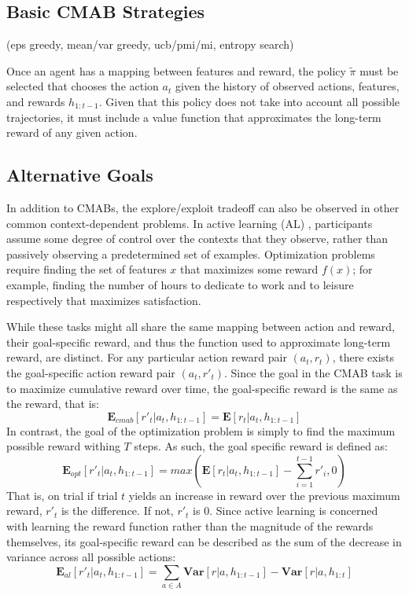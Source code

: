 \documentclass[10pt,letterpaper]{article}
\begin{document}
	
	
	\subsection{Basic CMAB Strategies}
	
	(eps greedy, mean/var greedy, ucb/pmi/mi, entropy search)
	
	Once an agent has a mapping between features and reward, the policy $\tilde{\pi}$ must be selected that chooses the action $a_{t}$ given the history of observed actions, features, and rewards $h_{1:t-1}$. Given that this policy does not take into account all possible trajectories, it must include a value function that approximates the long-term reward of any given action.
	
	\subsection{Alternative Goals}
	
	In addition to CMABs, the explore/exploit tradeoff can also be observed in other common context-dependent problems. In active learning (AL) \cite{BramleyGerstenbergTenenbaum2016a}, participants assume some degree of control over the contexts that they observe, rather than passively observing a predetermined set of examples. Optimization problems \cite{Rachlin1981a} require finding the set of features $x$ that maximizes some reward $f(x)$; for example, finding the number of hours to dedicate to work and to leisure respectively that maximizes satisfaction.
	
	While these tasks might all share the same mapping between action and reward, their goal-specific reward, and thus the function used to approximate long-term reward, are distinct. For any particular action reward pair $(a_{t}, r_{t})$, there exists the goal-specific action reward pair $(a_{t}, r'_{t})$. Since the goal in the CMAB task is to maximize cumulative reward over time, the goal-specific reward is the same as the reward, that is:
	$$\mathbf{E}_{cmab}[r'_{t}|a_{t}, h_{1:t-1}] = \mathbf{E}[r_{t}|a_{t}, h_{1:t-1}]$$
	In contrast, the goal of the optimization problem is simply to find the maximum possible reward withing $T$ steps. As such, the goal specific reward is defined as:
	$$\mathbf{E}_{opt}[r'_{t}|a_{t}, h_{1:t-1}] = max(\mathbf{E}[r_{t}|a_{t}, h_{1:t-1}] - \sum_{i=1}^{t-1}r'_{i}, 0)$$
	That is, on trial if trial $t$ yields an increase in reward over the previous maximum reward, $r'_{t}$ is the difference. If not, $r'_{t}$ is 0. Since active learning is concerned with learning the reward function rather than the magnitude of the rewards themselves, its goal-specific reward can be described as the sum of the decrease in variance across all possible actions:
	$$\mathbf{E}_{al}[r'_{t}|a_{t}, h_{1:t-1}] = \sum_{a \in A} \mathbf{Var}[r|a,h_{1:t-1}] - \mathbf{Var}[r|a,h_{1:t}]$$
	
	
	
	\setlength{\bibleftmargin}{.125in}
	\setlength{\bibindent}{-\bibleftmargin}
	
	
		
	
\end{document}
